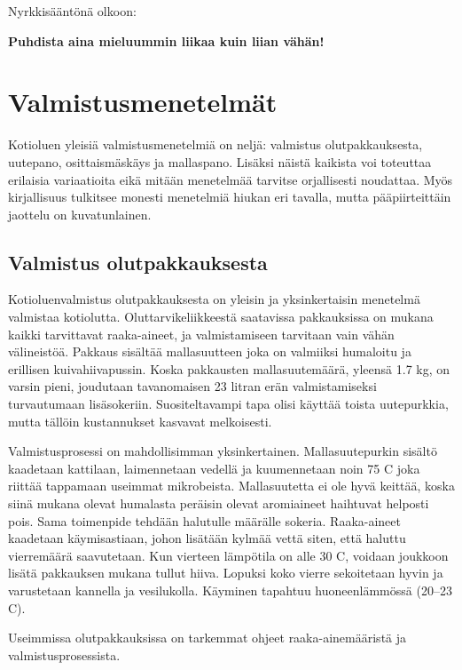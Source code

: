 \documentclass[a4paper,11pt]{report}
\begin{document}
Nyrkkisääntönä olkoon:

\begin{center}
\textbf{Puhdista aina mieluummin liikaa kuin liian vähän!}
\end{center}

\section{Valmistusmenetelmät}

Kotioluen yleisiä valmistusmenetelmiä on neljä: valmistus olutpakkauksesta, uutepano, osittaismäskäys ja mallaspano. Lisäksi näistä kaikista voi toteuttaa erilaisia variaatioita eikä mitään menetelmää tarvitse orjallisesti noudattaa. Myös kirjallisuus tulkitsee monesti menetelmiä hiukan eri tavalla, mutta pääpiirteittäin jaottelu on kuvatunlainen.

\subsection{Valmistus olutpakkauksesta}

Kotioluenvalmistus olutpakkauksesta on yleisin ja yksinkertaisin menetelmä valmistaa kotiolutta. Oluttarvikeliikkeestä saatavissa pakkauksissa on mukana kaikki tarvittavat raaka-aineet, ja valmistamiseen tarvitaan vain vähän välineistöä. Pakkaus sisältää mallasuutteen joka on valmiiksi humaloitu ja erillisen kuivahiivapussin. Koska pakkausten mallasuutemäärä, yleensä 1.7 kg, on varsin pieni, joudutaan tavanomaisen 23 litran erän valmistamiseksi turvautumaan lisäsokeriin. Suositeltavampi tapa olisi käyttää toista uutepurkkia, mutta tällöin kustannukset kasvavat melkoisesti.

Valmistusprosessi on mahdollisimman yksinkertainen. Mallasuutepurkin sisältö kaadetaan kattilaan, laimennetaan vedellä ja kuumennetaan noin 75 \degree C joka riittää tappamaan useimmat mikrobeista. Mallasuutetta ei ole hyvä keittää, koska siinä mukana olevat humalasta peräisin olevat aromiaineet haihtuvat helposti pois. Sama toimenpide tehdään halutulle määrälle sokeria. Raaka-aineet kaadetaan käymisastiaan, johon lisätään kylmää vettä siten, että haluttu vierremäärä saavutetaan. Kun vierteen lämpötila on alle 30 \degree C, voidaan joukkoon lisätä pakkauksen mukana tullut hiiva. Lopuksi koko vierre sekoitetaan hyvin ja varustetaan kannella ja vesilukolla. Käyminen tapahtuu huoneenlämmössä (20--23 \degree C).

Useimmissa olutpakkauksissa on tarkemmat ohjeet raaka-ainemääristä ja valmistusprosessista.
\end{document}
